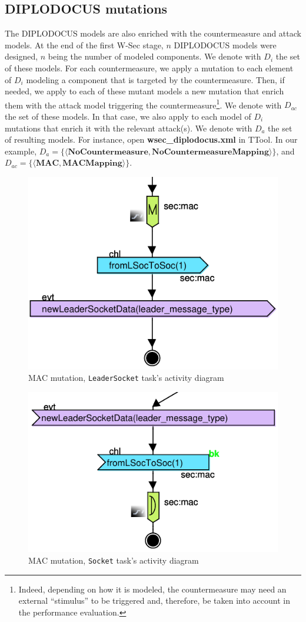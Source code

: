 \documentclass{article}
\begin{document}
\subsection{DIPLODOCUS mutations}

The DIPLODOCUS models are also enriched with the countermeasure and attack models. At the end of the first W-Sec stage, $n$ DIPLODOCUS models were designed, $n$ being the number of modeled components. We denote with $D_i$ the set of these models. For each countermeasure, we apply a mutation to each element of $D_i$ modeling a component that is targeted by the countermeasure. Then, if needed, we apply to each of these mutant models a new mutation that enrich them with the attack model triggering the countermeasure\footnote{Indeed, depending on how it is modeled, the countermeasure may need an external ``stimulus'' to be triggered and, therefore, be taken into account in the performance evaluation.}. We denote with $D_{a c}$ the set of these models. In that case, we also apply to each model of $D_i$ mutations that enrich it with the relevant attack(s). We denote with $D_a$ the set of resulting models. For instance, open \textbf{wsec\_diplodocus.xml} in TTool. In our example, $D_a = \{\langle \textbf{NoCountermeasure}, \textbf{NoCountermeasureMapping} \rangle\}$, and $D_{a c} = \{\langle \textbf{MAC}, \textbf{MACMapping} \rangle\}$.

\begin{figure}
	\centering
	\includegraphics[width=.5\textwidth]{figures/leadersocketmac.pdf}
	\caption{MAC mutation, \texttt{LeaderSocket} task's activity diagram}
	\label{fig:leadersocketmac}
\end{figure}

\begin{figure}
	\centering
	\includegraphics[width=.5\textwidth]{figures/socketmac.pdf}
	\caption{MAC mutation, \texttt{Socket} task's activity diagram}
	\label{fig:socketmac}
\end{figure}
\end{document}
